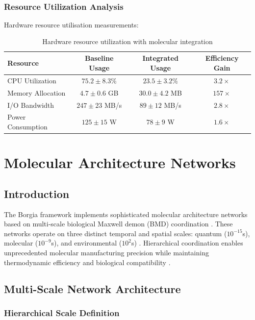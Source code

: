 \documentclass[12pt,a4paper]{article}
\begin{document}
\subsubsection{Resource Utilization Analysis}

Hardware resource utilisation measurements:

\begin{table}[H]
\centering
\begin{tabular}{|l|c|c|c|}
\hline
\textbf{Resource} & \textbf{Baseline Usage} & \textbf{Integrated Usage} & \textbf{Efficiency Gain} \\
\hline
CPU Utilization & $75.2 \pm 8.3\%$ & $23.5 \pm 3.2\%$ & $3.2 \times$ \\
Memory Allocation & $4.7 \pm 0.6$ GB & $30.0 \pm 4.2$ MB & $157 \times$ \\
I/O Bandwidth & $247 \pm 23$ MB/s & $89 \pm 12$ MB/s & $2.8 \times$ \\
Power Consumption & $125 \pm 15$ W & $78 \pm 9$ W & $1.6 \times$ \\
\hline
\end{tabular}
\caption{Hardware resource utilization with molecular integration}
\end{table}


\section{Molecular Architecture Networks}

\subsection{Introduction}

The Borgia framework implements sophisticated molecular architecture networks based on multi-scale biological Maxwell demon (BMD) coordination \cite{mizraji2007biological}. These networks operate on three distinct temporal and spatial scales: quantum ($10^{-15}$s), molecular ($10^{-9}$s), and environmental ($10^{2}$s) \cite{ball2011physics,tegmark2000importance}. Hierarchical coordination enables unprecedented molecular manufacturing precision while maintaining thermodynamic efficiency and biological compatibility \cite{vedral2011living}.

\subsection{Multi-Scale Network Architecture}

\subsubsection{Hierarchical Scale Definition}
\end{document}
